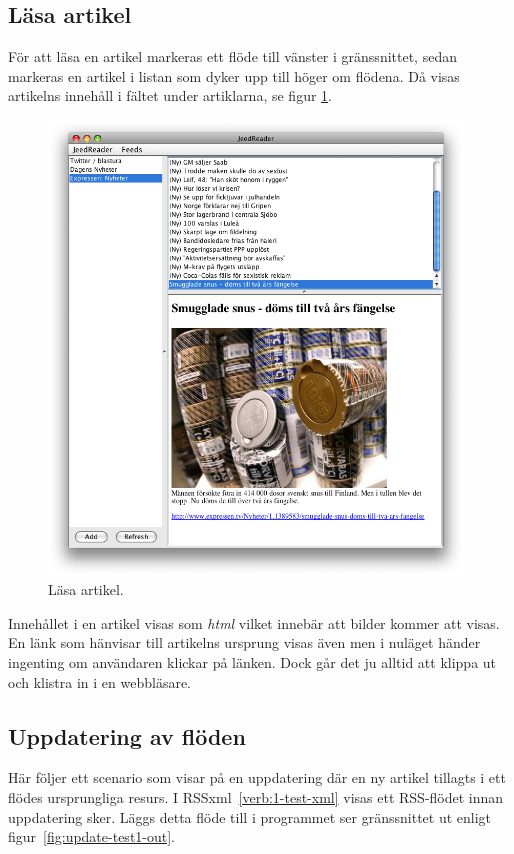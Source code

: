 \documentclass[titlepage, twoside, a4paper, 12pt]{article}
\begin{document}
\subsection{Läsa artikel}

För att läsa en artikel markeras ett flöde till vänster i
gränssnittet, sedan markeras en artikel i listan som dyker upp till
höger om flödena. Då visas artikelns innehåll i fältet under
artiklarna, se figur \ref{fig:read-item-out}.

\begin{figure}[H]
  \begin{center}
    \includegraphics[width=110mm]{images/read-item-out.png}
    \caption{Läsa artikel.}
    \label{fig:read-item-out}
  \end{center}
\end{figure}

Innehållet i en artikel visas som \textit{html} vilket innebär att
bilder kommer att visas. En länk som hänvisar till artikelns ursprung
visas även men i nuläget händer ingenting om användaren klickar på
länken. Dock går det ju alltid att klippa ut och klistra in i en
webbläsare.

\subsection{Uppdatering av flöden}

Här följer ett scenario som visar på en uppdatering där en ny artikel
tillagts i ett flödes ursprungliga resurs. I
RSSxml~\ref{verb:1-test-xml} visas ett RSS-flödet innan uppdatering
sker. Läggs detta flöde till i programmet ser gränssnittet ut enligt
figur~\ref{fig:update-test1-out}.
\end{document}
